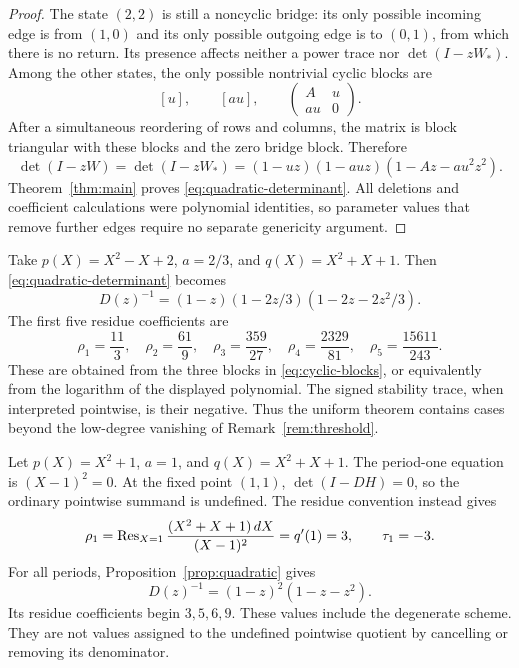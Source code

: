 \begin{proof}
The state $(2,2)$ is still a noncyclic bridge: its only possible
incoming edge is from $(1,0)$ and its only possible outgoing edge
is to $(0,1)$, from which there is no return. Its presence affects
neither a power trace nor $\det(I-zW_*)$. Among the other states,
the only possible nontrivial cyclic blocks are
\begin{equation}\label{eq:cyclic-blocks}
 [u],\qquad [au],\qquad
 \begin{pmatrix}A&u\\au&0\end{pmatrix}.
\end{equation}
After a simultaneous reordering of rows and columns, the matrix is
block triangular with these blocks and the zero bridge block.
Therefore
\[
 \det(I-zW)=\det(I-zW_*)
   =(1-uz)(1-auz)(1-Az-au^2z^2).
\]
Theorem~\ref{thm:main} proves \eqref{eq:quadratic-determinant}.
All deletions and coefficient calculations were polynomial identities,
so parameter values that remove further edges require no separate
genericity argument.
\end{proof}

\begin{example}\label{ex:nontrivial}
Take $p(X)=X^2-X+2$, $a=2/3$, and $q(X)=X^2+X+1$.
Then \eqref{eq:quadratic-determinant} becomes
\[
 D(z)^{-1}=(1-z)(1-2z/3)(1-2z-2z^2/3).
\]
The first five residue coefficients are
\[
 \rho_1=\frac{11}{3},\quad
 \rho_2=\frac{61}{9},\quad
 \rho_3=\frac{359}{27},\quad
 \rho_4=\frac{2329}{81},\quad
 \rho_5=\frac{15611}{243}.
\]
These are obtained from the three blocks in
\eqref{eq:cyclic-blocks}, or equivalently from the logarithm of the
displayed polynomial. The signed stability trace, when interpreted
pointwise, is their negative. Thus the uniform theorem contains
cases beyond the low-degree vanishing of
Remark~\ref{rem:threshold}.
\end{example}

\begin{example}\label{ex:parabolic}
Let $p(X)=X^2+1$, $a=1$, and $q(X)=X^2+X+1$.
The period-one equation is $(X-1)^2=0$. At the fixed point $(1,1)$,
$\det(I-DH)=0$, so the ordinary pointwise summand is undefined.
The residue convention instead gives
\[
 \rho_1=\operatorname{Res}_{X=1}\frac{(X^2+X+1)\,dX}{(X-1)^2}=q'(1)=3,
 \qquad\tau_1=-3.
\]
For all periods, Proposition~\ref{prop:quadratic} gives
\[
 D(z)^{-1}=(1-z)^2(1-z-z^2).
\]
Its residue coefficients begin $3,5,6,9$. These values include the
degenerate scheme. They are not values assigned to the undefined
pointwise quotient by cancelling or removing its denominator.
\end{example}

